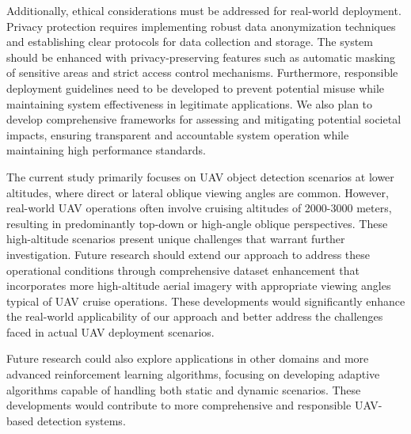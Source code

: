 \documentclass[lettersize,journal]{IEEEtran}
\begin{document}
Additionally, ethical considerations must be addressed for real-world deployment. Privacy protection requires implementing robust data anonymization techniques and establishing clear protocols for data collection and storage. The system should be enhanced with privacy-preserving features such as automatic masking of sensitive areas and strict access control mechanisms. Furthermore, responsible deployment guidelines need to be developed to prevent potential misuse while maintaining system effectiveness in legitimate applications. We also plan to develop comprehensive frameworks for assessing and mitigating potential societal impacts, ensuring transparent and accountable system operation while maintaining high performance standards.

The current study primarily focuses on UAV object detection scenarios at lower altitudes, where direct or lateral oblique viewing angles are common.  However, real-world UAV operations often involve cruising altitudes of 2000-3000 meters, resulting in predominantly top-down or high-angle oblique perspectives.  These high-altitude scenarios present unique challenges that warrant further investigation.  Future research should extend our approach to address these operational conditions through comprehensive dataset enhancement that incorporates more high-altitude aerial imagery with appropriate viewing angles typical of UAV cruise operations. These developments would significantly enhance the real-world applicability of our approach and better address the challenges faced in actual UAV deployment scenarios.

Future research could also explore applications in other domains and more advanced reinforcement learning algorithms, focusing on developing adaptive algorithms capable of handling both static and dynamic scenarios. These developments would contribute to more comprehensive and responsible UAV-based detection systems.








\vfill
\end{document}

